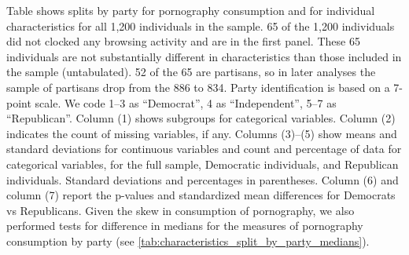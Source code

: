 \documentclass[12pt, letterpaper]{article}
\begin{document}
\begin{table}[ht]
{		Table shows splits by party for pornography consumption and for individual characteristics for all 1,200 individuals in the sample.
		65 of the 1,200 individuals did not clocked any browsing activity and are in the first panel.
		These 65 individuals are not substantially different in characteristics than those included in the sample (untabulated).
		52 of the 65 are partisans, so in later analyses the sample of partisans drop from the 886 to 834.
		Party identification is based on a 7-point scale. We code 1--3 as ``Democrat'', 4 as ``Independent'', 5--7 as ``Republican''.
		Column (1) shows subgroups for categorical variables.
		Column (2) indicates the count of missing variables, if any.
		Columns (3)--(5) show means and standard deviations for continuous variables and count and percentage of data for categorical variables, for the full sample, Democratic individuals, and Republican individuals.
		Standard deviations and percentages in parentheses.
		Column (6) and column (7) report the p-values and standardized mean differences for Democrats vs Republicans.
		Given the skew in consumption of pornography, we also performed tests for difference in medians for the measures of pornography consumption by party (see \cref{tab:characteristics_split_by_party_medians}).
	}
\end{table}
\end{document}

